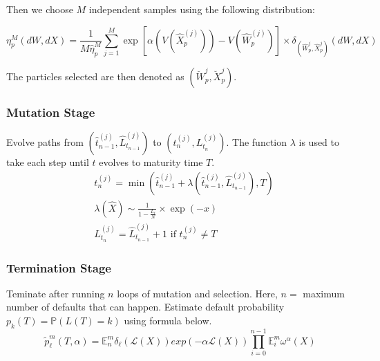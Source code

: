Then we choose $M$ independent samples using the following distribution:

\begin{equation}
	\eta_{p}^{M} (dW,dX) = \frac{1}{M \hat{\eta}_{p}^{M}} \sum_{j=1}^{M} 
	\exp \left[ \alpha \left( V(\hat{X}_{p}^{(j)}) \right) - V(\hat{W}^{(j)}_{p}) 
	\right] \times \delta_{(\hat{W}_p^{j},\hat{X}_p^{j})} (dW,dX)
\end{equation}

The particles selected are then denoted as $(\breve{W}_p^{j},\breve{X}_p^{j})$.

\subsubsection{Mutation Stage}
Evolve paths from $\left( \hat{t}_{n-1}^{(j)}, \hat{L}_{t_{n-1}}^{(j)}\right)$ to $\left(t^{(j)}_{n}, L_{t_{n}}^{(j)} \right)$.
The function $\lambda$ is used to take each step until $t$ evolves to maturity time $T$. 
		\begin{equation*}
				\begin{split}
					&t^{(j)}_{n}= \min\left(\hat{t}^{(j)}_{n-1} + \lambda\left(\hat{t}^{(j)}_{n-1},\hat{L}_{t_{n-1}}^{(j)}\right),T\right) \\
					& \lambda\left(\hat{X}\right) \sim \frac{1}{1-\frac{L_{t}}{N}} \times \exp(-x) \\
					&L_{t_{n}}^{(j)} = \hat{L}_{t_{n-1}}^{(j)} + 1 \text{ if } t^{(j)}_{n} 		\neq T					
				\end{split}	
		\end{equation*}

\subsubsection{Termination Stage}
Teminate after running $n$ loops of mutation and selection. Here, $n =$ maximum number of defaults that can happen.
 Estimate default probability $p_k(T) = \mathbb{P}\left( L\left( T \right) = k
		      \right)$ using formula below.
\begin{equation*}
	\tilde{p}^m_{\ell}(T,\alpha) = \mathbb{E}^{m}_{n}{\delta_{\ell}(\mathcal{L}(X))exp(-\alpha \mathcal{L}(X))}\prod_{i=0}^{n-1}\mathbb{E}_{i}^{m}\omega^{\alpha}(X)
\end{equation*}
